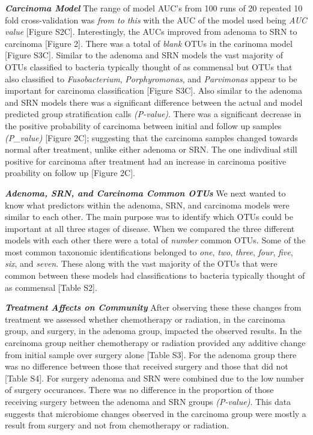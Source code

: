 \documentclass[12pt,]{article}
\begin{document}
\textbf{\emph{Carcinoma Model}} The range of model AUC's from 100 runs
of 20 repeated 10 fold cross-validation was \emph{from to this} with the
AUC of the model used being \emph{AUC value} {[}Figure S2C{]}.
Interestingly, the AUCs improved from adenoma to SRN to carcinoma
{[}Figure 2{]}. There was a total of \emph{blank} OTUs in the carinoma
model {[}Figure S3C{]}. Similar to the adenoma and SRN models the vast
majority of OTUs classified to bacteria typically thought of as
commensal but OTUs that also classified to \emph{Fusobacterium},
\emph{Porphyromonas}, and \emph{Parvimonas} appear to be important for
carcinoma classification {[}Figure S3C{]}. Also similar to the adenoma
and SRN models there was a significant difference between the actual and
model predicted group stratification calls \emph{(P-value)}. There was a
significant decrease in the positive probability of carcinoma between
initial and follow up samples \emph{(P\_value)} {[}Figure 2C{]};
suggesting that the carcinoma samples changed towards normal after
treatment, unlike either adenoma or SRN. The one indivdiual still
positive for carcinoma after treatment had an increase in carcinoma
positive proability on follow up {[}Figure 2C{]}.

\textbf{\emph{Adenoma, SRN, and Carcinoma Common OTUs}} We next wanted
to know what predictors within the adenoma, SRN, and carcinoma models
were similar to each other. The main purpose was to identify which OTUs
could be important at all three stages of disease. When we compared the
three different models with each other there were a total of
\emph{number} common OTUs. Some of the most common taxonomic
identifications belonged to \emph{one}, \emph{two}, \emph{three},
\emph{four}, \emph{five}, \emph{six}, and \emph{seven}. These along with
the vast majority of the OTUs that were common between these models had
classifications to bacteria typically thought of as commensal {[}Table
S2{]}.

\textbf{\emph{Treatment Affects on Community}} After observing these
these changes from treatment we assessed whether chemotherapy or
radiation, in the carcinoma group, and surgery, in the adenoma group,
impacted the observed results. In the carcinoma group neither
chemotherapy or radiation provided any additive change from initial
sample over surgery alone {[}Table S3{]}. For the adenoma group there
was no difference between those that received surgery and those that did
not {[}Table S4{]}. For surgery adenoma and SRN were combined due to the
low number of surgery occurances. There was no difference in the
proportion of those receiving surgery between the adenoma and SRN groups
\emph{(P-value)}. This data suggests that microbiome changes observed in
the carcinoma group were mostly a result from surgery and not from
chemotherapy or radiation.
\end{document}
